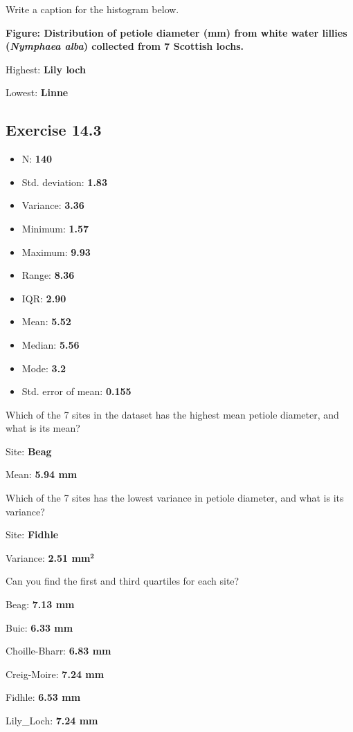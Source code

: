 \documentclass[
  openany]{krantz}
\providecommand{\tightlist}{%
  \setlength{\itemsep}{0pt}\setlength{\parskip}{0pt}}
\begin{document}
Write a caption for the histogram below.

\textbf{Figure: Distribution of petiole diameter (mm) from white water lillies (\emph{Nymphaea alba}) collected from 7 Scottish lochs.}

Highest: \textbf{Lily loch}

Lowest: \textbf{Linne}

\hypertarget{exercise-14.3}{%
\subsection{Exercise 14.3}\label{exercise-14.3}}

\begin{itemize}
\tightlist
\item
  N: \textbf{140}
\item
  Std. deviation: \textbf{1.83}
\item
  Variance: \textbf{3.36}
\item
  Minimum: \textbf{1.57}
\item
  Maximum: \textbf{9.93}
\item
  Range: \textbf{8.36}
\item
  IQR: \textbf{2.90}
\item
  Mean: \textbf{5.52}
\item
  Median: \textbf{5.56}
\item
  Mode: \textbf{3.2}
\item
  Std. error of mean: \textbf{0.155}
\end{itemize}

Which of the 7 sites in the dataset has the highest mean petiole diameter, and what is its
mean?

Site: \textbf{Beag}

Mean: \textbf{5.94 mm}

Which of the 7 sites has the lowest variance in petiole diameter, and what is its variance?

Site: \textbf{Fidhle}

Variance: \textbf{2.51 mm\(\mathbf{^2}\)}

Can you find the first and third quartiles for each site?

Beag: \textbf{7.13 mm}

Buic: \textbf{6.33 mm}

Choille-Bharr: \textbf{6.83 mm}

Creig-Moire: \textbf{7.24 mm}

Fidhle: \textbf{6.53 mm}

Lily\_Loch: \textbf{7.24 mm}
\end{document}
